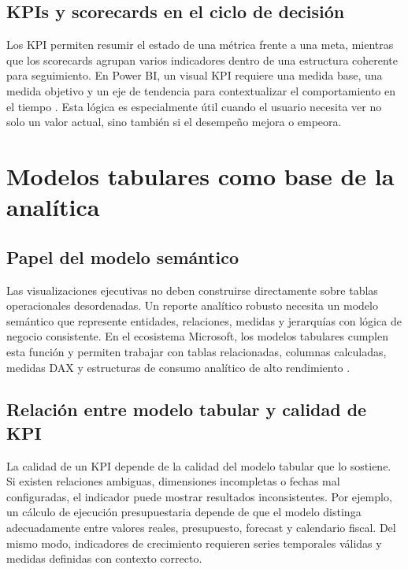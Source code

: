 \documentclass[12pt]{article}
\begin{document}
\subsection{KPIs y scorecards en el ciclo de decisión}
Los KPI permiten resumir el estado de una métrica frente a una meta, mientras que los scorecards agrupan varios indicadores dentro de una estructura coherente para seguimiento. En Power BI, un visual KPI requiere una medida base, una medida objetivo y un eje de tendencia para contextualizar el comportamiento en el tiempo \cite{ms_kpi_visual}. Esta lógica es especialmente útil cuando el usuario necesita ver no solo un valor actual, sino también si el desempeño mejora o empeora.

\section{Modelos tabulares como base de la analítica}
\subsection{Papel del modelo semántico}
Las visualizaciones ejecutivas no deben construirse directamente sobre tablas operacionales desordenadas. Un reporte analítico robusto necesita un modelo semántico que represente entidades, relaciones, medidas y jerarquías con lógica de negocio consistente. En el ecosistema Microsoft, los modelos tabulares cumplen esta función y permiten trabajar con tablas relacionadas, columnas calculadas, medidas DAX y estructuras de consumo analítico de alto rendimiento \cite{ms_tabular_models}.

\subsection{Relación entre modelo tabular y calidad de KPI}
La calidad de un KPI depende de la calidad del modelo tabular que lo sostiene. Si existen relaciones ambiguas, dimensiones incompletas o fechas mal configuradas, el indicador puede mostrar resultados inconsistentes. Por ejemplo, un cálculo de ejecución presupuestaria depende de que el modelo distinga adecuadamente entre valores reales, presupuesto, forecast y calendario fiscal. Del mismo modo, indicadores de crecimiento requieren series temporales válidas y medidas definidas con contexto correcto.
\end{document}
